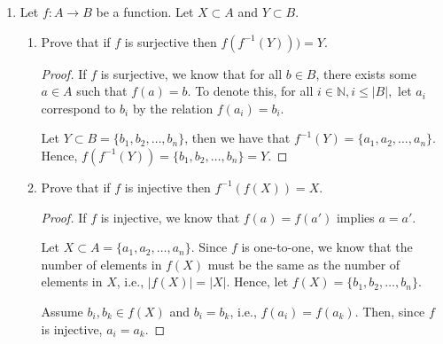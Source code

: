\documentclass[11pt]{article}
\newcommand{\bbN}{\mathbb{N}}
\theoremstyle{definition}
\numberwithin{equation}{subsection}
\begin{document}
\begin{enumerate}
\begin{enumerate}
\begin{proof}
We know that there exists some $a_0 \in A$ such that $(g \circ f) (a_0)=c_0$, and $f(a_0)=b_0$. Hence, $g(b_0)=c_0$ and we have reached a contradiction.

\renewcommand\qedsymbol{QED}
\end{proof}

\item Suppose that $g$ and $g\circ f$ are surjective. Is $f$ necessarily surjective?

\begin{proof}
No. For a counterexample, consider $A = \{1\}, B = \{p,q\}, C = \{x\}$. Let $f\colon A \rightarrow B$ be defined by $f(1)=p$ and let $g\colon B \rightarrow C$ be defined by $g(p)=g(q)=x$. Then both $g$ and $g \circ f$ are surjective, but $f$ is not surjective.

\renewcommand\qedsymbol{QED}
\end{proof}

\end{enumerate}





\item Let $f:A\longrightarrow B$ be a function. Let $X\subset A$ and $Y\subset B.$ 
\begin{enumerate}
\item Prove that if $f$ is surjective then $f(f^{-1} (Y)))=Y.$
\begin{proof}
If $f$ is surjective, we know that for all $b \in B$, there exists some $a \in A$ such that $f(a)=b$. To denote this, for all $i \in \bbN, i \leq |B|,$ let $a_i$ correspond to $b_i$ by the relation $f(a_i)=b_i$.

Let $Y \subset B = \{b_1, b_2, \dots, b_n\}$, then we have that $f^{-1}(Y)=\{a_1, a_2, \dots, a_n\}$. Hence,  $f(f^{-1}(Y))=\{b_1, b_2, \dots, b_n\} = Y$.

\renewcommand\qedsymbol{QED}
\end{proof}

 \item Prove that if $f$ is injective then $f^{-1}(f(X))=X.$
 \begin{proof}
 If $f$ is injective, we know that $f(a)=f(a')$ implies $a=a'$. 
 
Let $X \subset A = \{a_1, a_2, \dots, a_n\}$. Since $f$ is one-to-one, we know that the number of elements in $f(X)$ must be the same as the number of elements in $X$, i.e., $|f(X)|=|X|$. Hence, let $f(X)=\{b_1, b_2, \dots, b_n\}$. 

Assume $b_i, b_k \in f(X)$ and $b_i = b_k$, i.e., $f(a_i)=f(a_k)$. Then, since $f$ is injective, $a_i =a_k$.


\end{proof}
\end{enumerate}
\end{enumerate}
\end{document}

